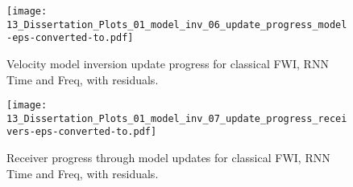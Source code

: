\begin{figure}[!ht]
        \centering
        \texttt{[image: 13\_Dissertation\_Plots\_01\_model\_inv\_06\_update\_progress\_model-eps-converted-to.pdf]}
        \caption[Velocity model inversion update progress.]{Velocity model inversion update progress for classical FWI, RNN Time and Freq, with residuals.}
	\label{fig:app_results_rnn_update_progress_model}
\end{figure}

\begin{figure}[!ht]
        \centering
        \texttt{[image: 13\_Dissertation\_Plots\_01\_model\_inv\_07\_update\_progress\_receivers-eps-converted-to.pdf]}
        \caption[Receiver progress through model updates.]{Receiver progress through model updates for classical FWI, RNN Time and Freq, with residuals.}
	\label{fig:app_results_rnn_update_progress_rcv}
\end{figure}
